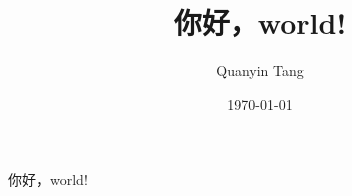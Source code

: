 \documentclass[UTF8]{ctexart}
\title{你好，world!}
\author{Quanyin Tang}
\date{\today}
\begin{document}
\maketitle %
你好，world!
\end{document}
